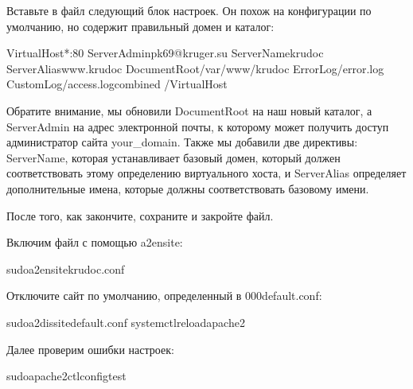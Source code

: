 \documentclass[a4paper,10pt,russian]{report}
\begin{document}
\sphinxAtStartPar
Вставьте в файл следующий блок настроек. Он похож на конфигурации по умолчанию, но содержит правильный домен и каталог:

\begin{sphinxVerbatim}[commandchars=\\\{\}]
\PYGZlt{}VirtualHost*:80\PYGZgt{}
ServerAdminpk69@kruger.su
ServerNamekrudoc
ServerAliaswww.krudoc
DocumentRoot/var/www/krudoc
ErrorLog/error.log
CustomLog/access.logcombined
\PYGZlt{}/VirtualHost\PYGZgt{}
\end{sphinxVerbatim}

\sphinxAtStartPar
Обратите внимание, мы обновили DocumentRoot на наш новый каталог, а ServerAdmin на адрес электронной почты,
к которому может получить доступ администратор сайта your\_domain. Также мы добавили две директивы: ServerName,
которая устанавливает базовый домен, который должен соответствовать этому определению виртуального хоста,
и ServerAlias \textendash{} определяет дополнительные имена, которые должны соответствовать базовому имени.

\sphinxAtStartPar
После того, как закончите, сохраните и закройте файл.

\sphinxAtStartPar
Включим файл с помощью a2ensite:

\begin{sphinxVerbatim}[commandchars=\\\{\}]
\PYGZdl{}sudoa2ensitekrudoc.conf
\end{sphinxVerbatim}

\sphinxAtStartPar
Отключите сайт по умолчанию, определенный в 000\sphinxhyphen{}default.conf:

\begin{sphinxVerbatim}[commandchars=\\\{\}]
\PYGZdl{}sudoa2dissite\PYGZhy{}default.conf
\PYGZdl{}systemctlreloadapache2
\end{sphinxVerbatim}

\sphinxAtStartPar
Далее проверим ошибки настроек:

\begin{sphinxVerbatim}[commandchars=\\\{\}]
\PYGZdl{}sudoapache2ctlconfigtest
\end{sphinxVerbatim}
\end{document}
